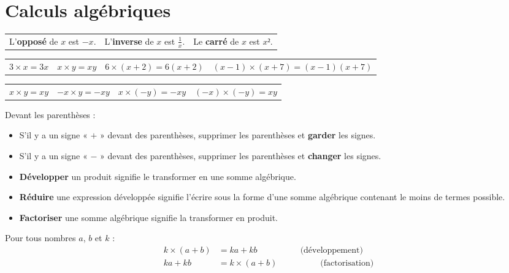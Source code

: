 \documentclass[a4paper,10pt]{article}
\begin{document}
\pagebreak
\section{Calculs algébriques}

\begin{vocabulaire}
	\begin{tabularx}{\linewidth}{XXX}
		L'\textbf{opposé} de $x$ est $-x$. & L'\textbf{inverse} de $x$ est $\frac{1}{x}$. & Le \textbf{carré} de $x$ est $x²$.
	\end{tabularx}
\end{vocabulaire}

\begin{greybox}[frametitle={Notation}]
	\newcommand{\localSpacing}{1.8em}
	\begin{tabular}{llll}
		$3 × x = 3x$ \hspace{\localSpacing} & $x × y = xy$ \hspace{\localSpacing} & $6 × (x + 2) = 6(x + 2)$ \hspace{\localSpacing} & $(x - 1) × (x + 7) = (x - 1)(x + 7)$
	\end{tabular}
\end{greybox}

\begin{greybox}[frametitle={Règle des signes}]
	\begin{tabularx}{\linewidth}{XXXX}
		$x × y = xy$ & $- x × y = -xy$ & $x × (-y) = -xy$ & $(-x) × (-y) = xy$
	\end{tabularx}
	\vspace{1em}

	Devant les parenthèses :
	\begin{itemize}
		\item S’il y a un signe « $+$ » devant des parenthèses, supprimer les parenthèses et \textbf{garder} les signes.
		\item S’il y a un signe « $-$ » devant des parenthèses, supprimer les parenthèses et \textbf{changer} les signes.
	\end{itemize}
\end{greybox}

\begin{definition}[]
	\begin{itemize}
		\item \textbf{Développer} un produit signifie le transformer en une somme algébrique.
		\item \textbf{Réduire} une expression développée signifie l’écrire sous la forme d’une somme algébrique contenant le moins de termes possible.
		\item \textbf{Factoriser} une somme algébrique signifie la transformer en produit.
	\end{itemize}
\end{definition}

\begin{propriete}
	Pour tous nombres $a$, $b$ et $k$ :
	\begin{align*}
		k × (a + b) & = ka + kb \hspace{5em}\text{(développement)}     \\
		ka + kb     & = k × (a + b) \hspace{5em}\text{(factorisation)}
	\end{align*}
\end{propriete}
\end{document}
